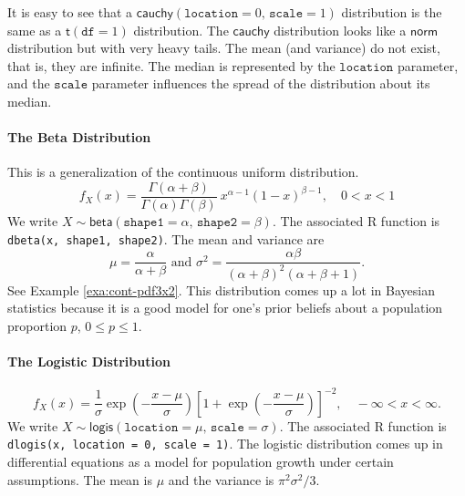 \documentclass[captions=tableheading]{scrbook}
\begin{document}
It is easy to see that a \(\mathsf{cauchy}(\mathtt{location}=0,\,\mathtt{scale}=1)\) distribution is the same as a \(\mathsf{t}(\mathtt{df}=1)\) distribution. The \(\mathsf{cauchy}\) distribution looks like a \(\mathsf{norm}\) distribution but with very heavy tails. The mean (and variance) do not exist, that is, they are infinite. The median is represented by the \(\mathtt{location}\) parameter, and the \(\mathtt{scale}\) parameter influences the spread of the distribution about its median.

\paragraph*{The Beta Distribution}
\label{sub:The-Beta-Distribution}

This is a generalization of the continuous uniform distribution.
\begin{equation}
f_{X}(x)=\frac{\Gamma(\alpha+\beta)}{\Gamma(\alpha)\Gamma(\beta)}\: x^{\alpha-1}(1-x)^{\beta-1},\quad0<x<1
\end{equation}
We write \(X\sim\mathsf{beta}(\mathtt{shape1}=\alpha,\,\mathtt{shape2}=\beta)\). The associated \textsf{R} function is \texttt{dbeta(x, shape1, shape2)}. The mean and variance are
\begin{equation} 
\mu=\frac{\alpha}{\alpha+\beta}\mbox{ and }\sigma^{2}=\frac{\alpha\beta}{\left(\alpha+\beta\right)^{2}\left(\alpha+\beta+1\right)}.
\end{equation}
See Example \ref{exa:cont-pdf3x2}. This distribution comes up a lot in Bayesian statistics because it is a good model for one's prior beliefs about a population proportion \(p\), \(0\leq p\leq1\).


\paragraph*{The Logistic Distribution}
\label{sub:The-Logistic-Distribution}

\begin{equation}
f_{X}(x)=\frac{1}{\sigma}\exp\left(-\frac{x-\mu}{\sigma}\right)\left[1+\exp\left(-\frac{x-\mu}{\sigma}\right)\right]^{-2},\quad-\infty<x<\infty.
\end{equation}
We write \(X\sim\mathsf{logis}(\mathtt{location}=\mu,\,\mathtt{scale}=\sigma)\). The associated \textsf{R} function is \texttt{dlogis(x, location = 0, scale = 1)}. The logistic distribution comes up in differential equations as a model for population growth under certain assumptions. The mean is \(\mu\) and the variance is \(\pi^{2}\sigma^{2}/3\).
\end{document}
